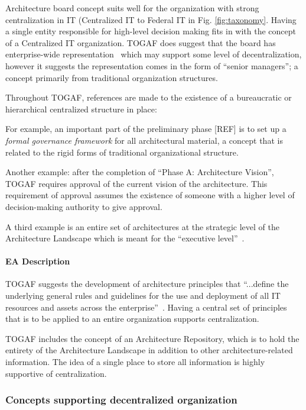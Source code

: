 Architecture board concept suits well for the organization with strong centralization in IT (Centralized IT to Federal IT in Fig. \ref{fig:taxonomy}.  Having a single entity responsible for high-level decision making fits in with the concept of a Centralized IT organization. TOGAF does suggest that the board has enterprise-wide representation~\cite[Ch. 47]{togaf9.1} which may support some level of decentralization, however it suggests the representation comes in the form of ``senior managers''; a concept primarily from traditional organization structures. 

Throughout TOGAF, references are made to the existence of a bureaucratic or hierarchical centralized structure in place: 

For example, an important part of the preliminary phase [REF] is to set up a \textit{formal governance framework} for all architectural material, a concept that is related to the rigid forms of traditional organizational structure. 

Another example: after the completion of ``Phase A: Architecture Vision'', TOGAF requires approval of the current vision of the architecture. This requirement of approval assumes the existence of someone with a higher level of decision-making authority to give approval. 

A third example is an entire set of architectures at the strategic level of the Architecture Landscape which is meant for the ``executive level''~\cite[Ch. 20]{togaf9.1}.

\paragraph*{EA Description}
TOGAF suggests the development of architecture principles that ``...define the underlying general rules and guidelines for the use and deployment of all IT resources and assets across the enterprise''~\cite[Ch. 23]{togaf9.1}. Having a central set of principles that is to be applied to an entire organization supports centralization.

TOGAF includes the concept of an Architecture Repository, which is to hold the entirety of the Architecture Landscape in addition to other architecture-related information. The idea of a single place to store all information is highly supportive of centralization. 

\subsubsection{Concepts supporting decentralized organization}

